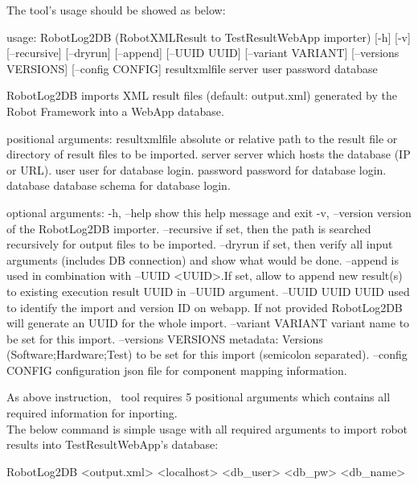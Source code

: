     The tool's usage should be showed as below:
\begin{robotlog}
usage: RobotLog2DB (RobotXMLResult to TestResultWebApp importer) [-h] [-v] 
                    [--recursive] [--dryrun] [--append] [--UUID UUID] 
                    [--variant VARIANT] [--versions VERSIONS] [--config CONFIG]
                    resultxmlfile server user password database

RobotLog2DB imports XML result files (default: output.xml) generated by the 
                     Robot Framework into a WebApp database.

positional arguments:
resultxmlfile        absolute or relative path to the result file or directory 
                     of result files to be imported.
server               server which hosts the database (IP or URL).
user                 user for database login.
password             password for database login.
database             database schema for database login.

optional arguments:
-h, --help           show this help message and exit
-v, --version        version of the RobotLog2DB importer.
--recursive          if set, then the path is searched recursively for output 
                     files to be imported.
--dryrun             if set, then verify all input arguments (includes DB 
                     connection) and show what would be done.
--append             is used in combination with --UUID <UUID>.If set, allow to 
                     append new result(s) to existing execution result UUID in 
                     --UUID argument.
--UUID UUID          UUID used to identify the import and version ID on webapp. 
                     If not provided RobotLog2DB will generate an UUID for the 
                     whole import.
--variant VARIANT    variant name to be set for this import.
--versions VERSIONS  metadata: Versions (Software;Hardware;Test) to be set for 
                     this import (semicolon separated).
--config CONFIG      configuration json file for component mapping information.
\end{robotlog}

    As above instruction, \pkg\ tool requires 5 positional arguments which 
    contains all required information for inporting.\\
    The below command is simple usage with all required arguments to import 
    robot results into TestResultWebApp's database:
\begin{robotlog}
RobotLog2DB <output.xml> <localhost> <db\_user> <db\_pw> <db\_name>
\end{robotlog}

